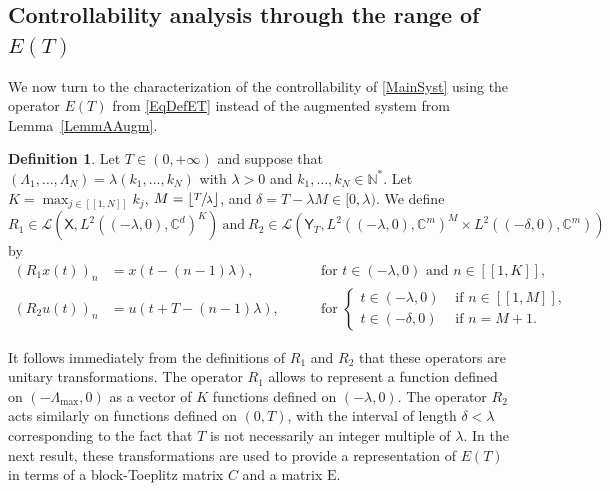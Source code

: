 \documentclass[10pt]{article}
\newcommand{\llbracket}{[\![}
\newcommand{\rrbracket}{]\!]}
\theoremstyle{plain}
\theoremstyle{definition}
\newtheorem{defi}[theo]{Definition}
\newcommand{\floor}[1]{\left\lfloor #1 \right\rfloor}
\newcommand{\Epsilon}{\mathrm E}
\numberwithin{equation}{section}\numberwithin{figure}{section}\emergencystretch=3em
\begin{document}
\subsection{\texorpdfstring{Controllability analysis through the range of $E(T)$}{Controllability analysis through the range of E(T)}}

We now turn to the characterization of the controllability of \eqref{MainSyst} using the operator $E(T)$ from \eqref{EqDefET} instead of the augmented system from Lemma~\ref{LemmAAugm}.

\begin{defi}
\label{DefiR1R2}
Let $T \in (0, +\infty)$ and suppose that $(\Lambda_1, \dots, \Lambda_N) = \lambda (k_1, \dots, k_N)$ with $\lambda > 0$ and $k_1, \dots, k_N \in \mathbb N^\ast$. Let $K = \max_{j \in \llbracket 1, N\rrbracket} k_j$, $M = \floor{\sfrac{T}{\lambda}}$, and $\delta = T - \lambda M \in [0, \lambda)$. We define
\[
R_1 \in \mathcal L\left(\mathsf X, L^2((-\lambda, 0), \mathbb C^d)^K\right)\ \text{and}\ R_2 \in \mathcal L\left(\mathsf Y_T, L^2((-\lambda, 0), \mathbb C^m)^M \times L^2((-\delta, 0), \mathbb C^m)\right)
\]
by\vspace*{-3pt}
\[
\begin{aligned}
(R_1 x(t))_n & = x(t - (n-1)\lambda), & \quad & \text{ for } t \in (-\lambda, 0) \text{ and } n \in \llbracket 1, K\rrbracket, \\
(R_2 u(t))_n & = u(t + T - (n-1)\lambda), & & \text{ for } \left\{
\begin{aligned}
t \in (-\lambda, 0) & \text{ if } n \in \llbracket 1, M\rrbracket, \\
t \in (-\delta, 0) & \text{ if } n = M+1.
\end{aligned}\right.
\end{aligned}
\]
\end{defi}

It follows immediately from the definitions of $R_1$ and $R_2$ that these operators are unitary transformations. The operator $R_1$ allows to represent a function defined on $(-\Lambda_{\max}, 0)$ as a vector of $K$ functions defined on $(-\lambda, 0)$. The operator $R_2$ acts similarly on functions defined on $(0, T)$, with the interval of length $\delta < \lambda$ corresponding to the fact that $T$ is not necessarily an integer multiple of $\lambda$. In the next result, these transformations are used to provide a representation of $E(T)$ in terms of a block-Toeplitz matrix $C$ and a matrix $\Epsilon$.
\end{document}
